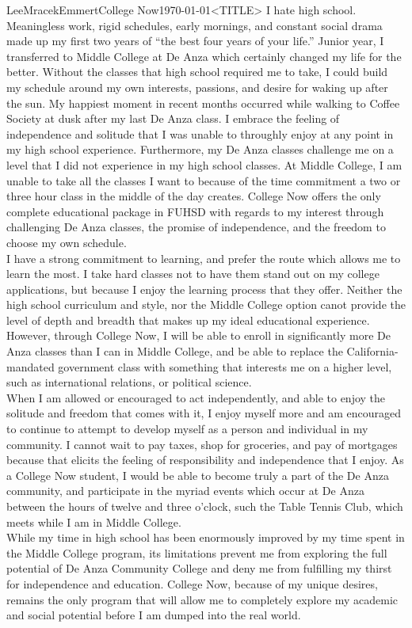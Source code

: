 \documentclass[a4paper]{article}
\begin{document}
\begin{mla}{Lee}{Mracek}{Emmert}{College Now}{\today}{<TITLE>}
    I hate high school. Meaningless work, rigid schedules, early mornings, and
    constant social drama made up my first two years of ``the best four years of
    your life.'' Junior year, I transferred to Middle College at De Anza which
    certainly changed my life for the better. Without the classes that high
    school required me to take, I could build my schedule around my own
    interests, passions, and desire for waking up after the sun. My happiest
    moment in recent months occurred while walking to Coffee Society at dusk
    after my last De Anza class. I embrace the feeling of independence and
    solitude that I was unable to throughly enjoy at any point in my high school experience. Furthermore, my De Anza classes challenge me on a level that I did not experience in my high school classes. At Middle College, I am unable to take all the classes I want to because of the time commitment a two or three hour class in the middle of the day creates. College Now offers the only complete educational package in FUHSD with regards to my interest through challenging De Anza classes, the promise of independence, and the freedom to choose my own schedule. \\
    I have a strong commitment to learning, and prefer the route which allows me to learn the most. I take hard classes not to have them stand out on my college applications, but because I enjoy the learning process that they offer. Neither the high school curriculum and style, nor the Middle College option canot provide the level of depth and breadth that makes up my ideal educational experience. However, through College Now, I will be able to enroll in significantly more De Anza classes than I can in Middle College, and be able to replace the California-mandated government class with something that interests me on a higher level, such as international relations, or political science. \\
    When I am allowed or encouraged to act independently, and able to enjoy the solitude and freedom that comes with it, I enjoy myself more and am encouraged to continue to attempt to develop myself as a person and individual in my community. I cannot wait to pay taxes, shop for groceries, and pay of mortgages because that elicits the feeling of responsibility and independence that I enjoy. As a College Now student, I would be able to become truly a part of the De Anza community, and participate in the myriad events which occur at De Anza between the hours of twelve and three o'clock, such the Table Tennis Club, which meets while I am in Middle College. \\
    While my time in high school has been enormously improved by my time spent in the Middle College program, its limitations prevent me from exploring the full potential of De Anza Community College and deny me from fulfilling my thirst for independence and education. College Now, because of my unique desires, remains the only program that will allow me to completely explore my academic and social potential before I am dumped into the real world.
\end{mla}
\end{document}
